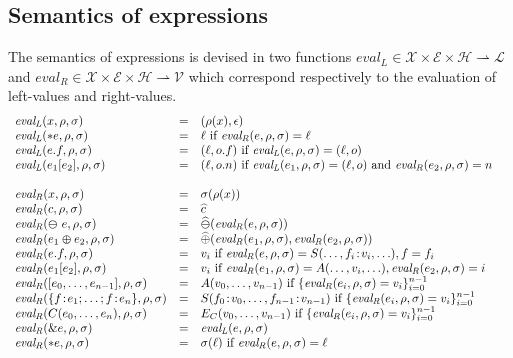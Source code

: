 \documentclass[12pt]{article}
\def\env{\rho}
\def\heap{\sigma}
\newcommand{\evalLeft}[3]{{\mathit{eval_L}}(#1,#2,#3)}
\newcommand{\evalRight}[3]{{\mathit{eval_R}}(#1,#2,#3)}
\newcommand{\field}[2]{#1\!:\!#2}
\def\emptyoffset{\epsilon}
\begin{document}
\newcommand{\valarray}[1]{A(#1)}
\newcommand{\valstruct}[1]{S(#1)}
\newcommand{\valenum}[2]{S_{#1}(#2)}
\subsection{Semantics of expressions} 

The semantics of expressions is devised in two functions
${\mathit{eval_L}} \in {\mathcal{X}} \times {\mathcal{E}} \times {\mathcal{H}} \rightharpoonup {\mathcal{L}}$
and 
${\mathit{eval_R}} \in {\mathcal{X}} \times {\mathcal{E}} \times {\mathcal{H}} \rightharpoonup {\mathcal{V}}$
which correspond respectively to the evaluation of left-values and right-values.
$$
\begin{array}{lcll}

  \evalLeft{x}{\env}{\heap} &=& (\env(x),\emptyoffset) \\
  \evalLeft{*e}{\env}{\heap} &=& \ell {\text{ if }} \evalRight{e}{\env}{\heap} = \ell\\
  \evalLeft{e.f}{\env}{\heap} &=& (\ell, o.f)  {\text{ if $\evalLeft{e}{\env}{\heap} = (\ell,o)$}}\\
  \evalLeft{e_1[e_2]}{\env}{\heap} &=& (\ell, o.n) {\text{ if $\evalLeft{e_1}{\env}{\heap} = (\ell,o)$ and }}
  \evalRight{e_2}{\env}{\heap} = n\\\\
  \evalRight{x}{\env}{\heap} &=& \heap(\env(x))\\
  \evalRight{c}{\env}{\heap} &=& \widehat{c} &\\
  \evalRight{\varominus~e}{\env}{\heap} &=& \widehat{\varominus} (\evalRight{e}{\env}{\heap})\\
  \evalRight{e_1 \varoplus e_2}{\env}{\heap} &=& 
  \widehat{\oplus}(\evalRight{e_1}{\env}{\heap},  \evalRight{e_2}{\env}{\heap})\\
  \evalRight{e.f}{\env}{\heap} &=& v_i {\text{ if }} 
  \evalRight{e}{\env}{\heap} = \valstruct{\ldots,\field{f_i}{v_i},\ldots}, f = f_i \\ 
  \evalRight{e_1[e_2]}{\env}{\heap} &=& v_i {\text{ if }} 
  \evalRight{e_1}{\env}{\heap} = \valarray{\ldots, v_i,\ldots},
  \evalRight{e_2}{\env}{\heap}=i\\
  \evalRight{[e_0,\ldots,e_{n-1}]}{\env}{\heap} &=& \valarray{v_0,\ldots,v_{n-1}}
  {\text{ if }} \{\evalRight{e_i}{\env}{\heap} = v_i\}_{i=0}^{n-1}\\
  \evalRight{\{f\!:\!e_1;\ldots;\field{f}{e_n}\}}{\env}{\heap} &=& 
  S(\field{f_0}{v_0},\ldots,\field{f_{n-1}}{v_{n-1}})  
  {\text{ if }} \{\evalRight{e_i}{\env}{\heap} = v_i\}_{i=0}^{n-1}\\
  \evalRight{C(e_0,\ldots,e_n)}{\env}{\heap} &=& E_C(v_0,\ldots,v_{n-1}) 
  {\text{ if }} \{\evalRight{e_i}{\env}{\heap} = v_i\}_{i=0}^{n-1}\\
  \evalRight{\&e}{\env}{\heap} &=& \evalLeft{e}{\env}{\heap}\\
  \evalRight{*e}{\env}{\heap} &=& \sigma(\ell) {\text{ if }} \evalRight{e}{\env}{\heap}=\ell\\
\end{array}
$$
\end{document}
